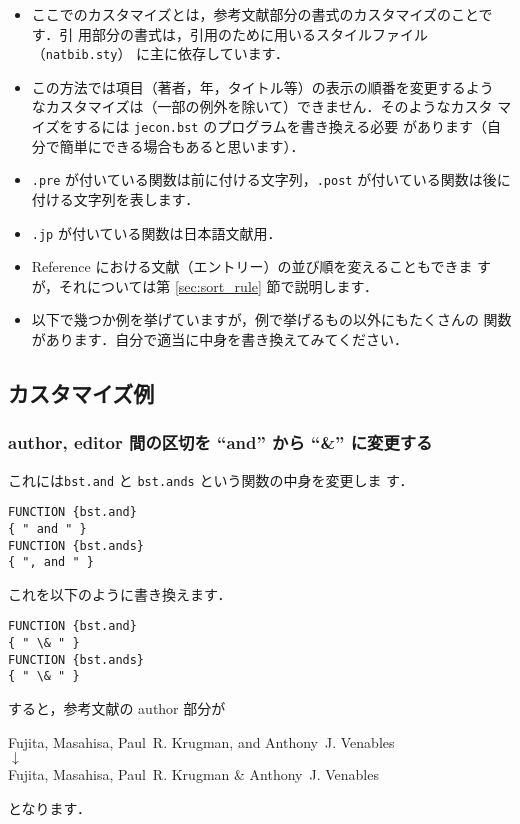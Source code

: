 \documentclass[a4j,10pt]{jarticle}
\begin{document}
\begin{itemize}
 \item ここでのカスタマイズとは，参考文献部分の書式のカスタマイズのことです．引
       用部分の書式は，引用のために用いるスタイルファイル（\texttt{natbib.sty}）
       に主に依存しています．
 \item この方法では項目（著者，年，タイトル等）の表示の順番を変更するよう
       なカスタマイズは（一部の例外を除いて）できません．そのようなカスタ
       マイズをするには \texttt{jecon.bst} のプログラムを書き換える必要
       があります（自分で簡単にできる場合もあると思います）．
 \item \texttt{.pre} が付いている関数は前に付ける文字列，\texttt{.post} 
       が付いている関数は後に付ける文字列を表します．
 \item \texttt{.jp} が付いている関数は日本語文献用．
 \item Reference における文献（エントリー）の並び順を変えることもできま
       すが，それについては第 \ref{sec:sort_rule} 節で説明します．
 \item 以下で幾つか例を挙げていますが，例で挙げるもの以外にもたくさんの
       関数があります．自分で適当に中身を書き換えてみてください．
\end{itemize}

\subsection{カスタマイズ例}

\subsubsection{author, editor 間の区切を ``and'' から ``\&'' に変更する}

これには\texttt{bst.and} と \texttt{bst.ands} という関数の中身を変更しま
す．
\begin{screen}
\begin{verbatim}
FUNCTION {bst.and}
{ " and " }
FUNCTION {bst.ands}
{ ", and " }
\end{verbatim}
\end{screen}

これを以下のように書き換えます．
\begin{screen}
\begin{verbatim}
FUNCTION {bst.and}
{ " \& " }
FUNCTION {bst.ands}
{ " \& " }
\end{verbatim}
\end{screen}

すると，参考文献の author 部分が
\begin{center}
Fujita, Masahisa, Paul~R. Krugman, and Anthony~J. Venables \\
 $\downarrow$ \\
Fujita, Masahisa, Paul~R. Krugman \& Anthony~J. Venables 
\end{center}
となります．
\end{document}
